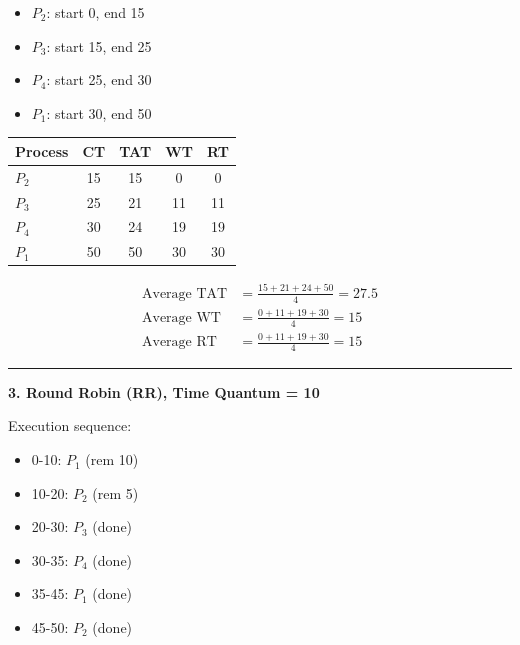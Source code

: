 \documentclass[a4paper, 10pt]{article}
\begin{document}
\begin{examplebox}{}{}
\begin{minipage}[t]{0.48\textwidth}
        \begin{itemize}
            \item $P_2$: start 0, end 15
            \item $P_3$: start 15, end 25
            \item $P_4$: start 25, end 30
            \item $P_1$: start 30, end 50
        \end{itemize}
    \end{minipage}
    \hfill
    \begin{minipage}[t]{0.48\textwidth}
        \begin{center}
            \begin{tabular}{@{} l c c c c @{}}
                \toprule
                Process & CT & TAT & WT & RT \\
                \midrule
                $P_2$   & 15 & 15  & 0  & 0  \\
                $P_3$   & 25 & 21  & 11 & 11 \\
                $P_4$   & 30 & 24  & 19 & 19 \\
                $P_1$   & 50 & 50  & 30 & 30 \\
                \bottomrule
            \end{tabular}
        \end{center}

        \begin{align*}
            \text{Average TAT} & = \frac{15 + 21 + 24 + 50}{4} = 27.5 \\
            \text{Average WT}  & = \frac{0 + 11 + 19 + 30}{4} = 15    \\
            \text{Average RT}  & = \frac{0 + 11 + 19 + 30}{4} = 15
        \end{align*}
    \end{minipage}

    \rule{\textwidth}{0.5pt}

    \textbf{3. Round Robin (RR), Time Quantum = 10}

    \begin{minipage}[t]{0.48\textwidth}
        Execution sequence:
        \begin{itemize}
            \item 0-10: $P_1$ (rem 10)
            \item 10-20: $P_2$ (rem 5)
            \item 20-30: $P_3$ (done)
            \item 30-35: $P_4$ (done)
            \item 35-45: $P_1$ (done)
            \item 45-50: $P_2$ (done)
        \end{itemize}


\end{minipage}
\end{examplebox}
\end{document}
